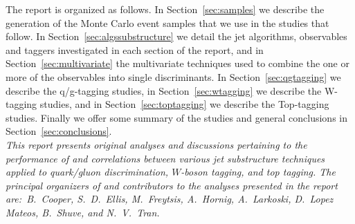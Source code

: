 The report is organized as follows. In Section~\ref{sec:samples} we describe the generation of the Monte Carlo event samples that we use in the studies that follow. In Section~\ref{sec:algssubstructure} we detail the jet algorithms, observables and taggers investigated in each section of the report, and in Section~\ref{sec:multivariate} the multivariate techniques used to combine the one or more of the observables into single discriminants. In Section~\ref{sec:qgtagging} we describe the q/g-tagging studies, in Section~\ref{sec:wtagging} we describe the W-tagging studies, and in Section~\ref{sec:toptagging} we describe the Top-tagging studies. Finally we offer some summary of the studies and general conclusions in Section~\ref{sec:conclusions}.\\

\emph{This report presents original analyses and discussions pertaining to the performance of and correlations between various jet substructure techniques applied to quark/gluon discrimination, $W$-boson tagging, and top tagging. The principal organizers of and contributors to the analyses presented in the report are:~B.~Cooper, S.~D.~Ellis, M.~Freytsis, A.~Hornig, A.~Larkoski, D.~Lopez Mateos, B.~Shuve, and N.~V.~Tran.}